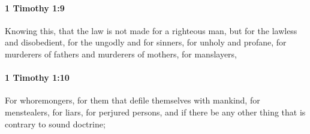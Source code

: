 		\paragraph{1 Timothy 1:9} %
			\label{1TIMOTHY-1-9}

			Knowing this, that the law is not made for a righteous man, but for the lawless and disobedient, for the ungodly and for sinners, for unholy and profane, for murderers of fathers and murderers of mothers, for manslayers,

			\begin{framed}
			\scriptsize
				\begin{compactdesc}
					\item[SBLG] 
				\end{compactdesc}
			\end{framed}

		\paragraph{1 Timothy 1:10} %
			\label{1TIMOTHY-1-10}

			For whoremongers, for them that defile themselves with mankind, for menstealers, for liars, for perjured persons, and if there be any other thing that is contrary to sound doctrine;

